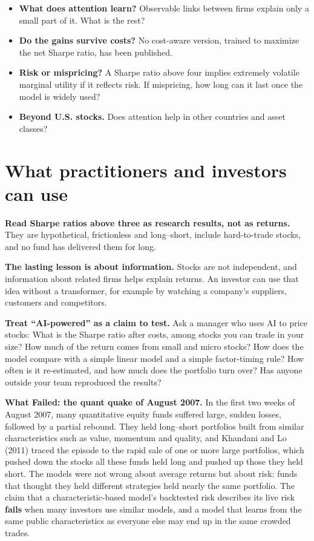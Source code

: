 \begin{itemize}
  \item \textbf{What does attention learn?} Observable links between firms explain only a small part of it. What is the rest?
  \item \textbf{Do the gains survive costs?} No cost-aware version, trained to maximize the net Sharpe ratio, has been published.
  \item \textbf{Risk or mispricing?} A Sharpe ratio above four implies extremely volatile marginal utility if it reflects risk. If mispricing, how long can it last once the model is widely used?
  \item \textbf{Beyond U.S. stocks.} Does attention help in other countries and asset classes?
\end{itemize}

\section{What practitioners and investors can use}
\label{sec:22-investors}

\textbf{Read Sharpe ratios above three as research results, not as returns.} They are hypothetical, frictionless and long--short, include hard-to-trade stocks, and no fund has delivered them for long.

\textbf{The lasting lesson is about information.} Stocks are not independent, and information about related firms helps explain returns. An investor can use that idea without a transformer, for example by watching a company's suppliers, customers and competitors.

\textbf{Treat ``AI-powered'' as a claim to test.} Ask a manager who uses AI to price stocks: What is the Sharpe ratio after costs, among stocks you can trade in your size? How much of the return comes from small and micro stocks? How does the model compare with a simple linear model and a simple factor-timing rule? How often is it re-estimated, and how much does the portfolio turn over? Has anyone outside your team reproduced the results?

\begin{callout}
\textbf{What Failed: the quant quake of August 2007.} In the first two weeks of August 2007, many quantitative equity funds suffered large, sudden losses, followed by a partial rebound. They held long--short portfolios built from similar characteristics such as value, momentum and quality, and Khandani and Lo (2011) traced the episode to the rapid sale of one or more large portfolios, which pushed down the stocks all these funds held long and pushed up those they held short. The models were not wrong about average returns but about risk: funds that thought they held different strategies held nearly the same portfolio. The claim that a characteristic-based model's backtested risk describes its live risk \textbf{fails} when many investors use similar models, and a model that learns from the same public characteristics as everyone else may end up in the same crowded trades.
\end{callout}
